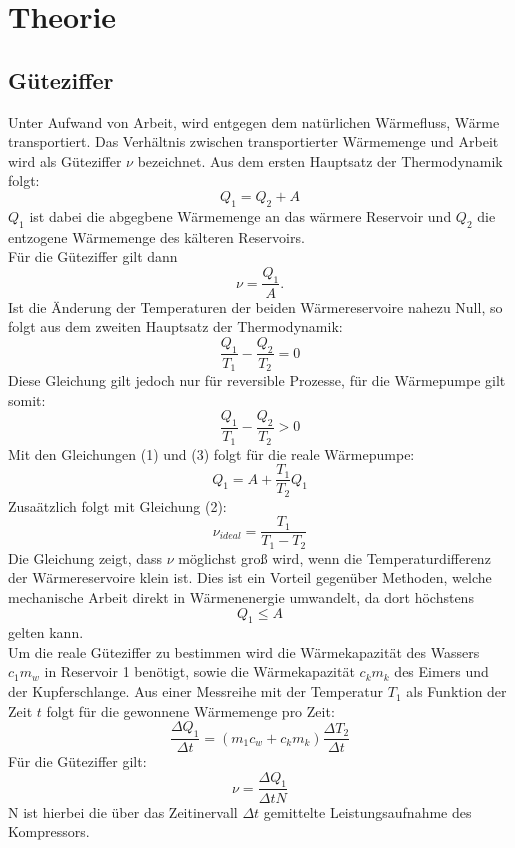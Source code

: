 \section{Theorie}
\subsection{Güteziffer}
Unter Aufwand von Arbeit, wird entgegen dem natürlichen Wärmefluss, Wärme transportiert.
Das Verhältnis zwischen transportierter Wärmemenge und Arbeit wird als Güteziffer $\nu$
bezeichnet. Aus dem ersten Hauptsatz der Thermodynamik folgt:
\begin{equation}
  Q_1 = Q_2 + A
\end{equation}
$Q_1$ ist dabei die abgegbene Wärmemenge an das wärmere Reservoir und $Q_2$ die
entzogene Wärmemenge des kälteren Reservoirs. \\
Für die Güteziffer gilt dann
\begin{equation}
  \nu = \frac{Q_1}{A} .
\end{equation}
Ist die Änderung der Temperaturen der beiden Wärmereservoire nahezu Null, so folgt
aus dem zweiten Hauptsatz der Thermodynamik:
\begin{equation}
  \frac{Q_1}{T_1} - \frac{Q_2}{T_2} = 0
\end{equation}
Diese Gleichung gilt jedoch nur für reversible Prozesse, für die Wärmepumpe gilt somit:
\begin{equation}
  \frac{Q_1}{T_1} - \frac{Q_2}{T_2} > 0
\end{equation}
Mit den Gleichungen (1) und (3) folgt für die reale Wärmepumpe:
\begin{equation}
  Q_1 = A + \frac{T_1}{T_2}Q_1
\end{equation}
Zusaätzlich folgt mit Gleichung (2):
\begin{equation}
  \nu_{ideal} = \frac{T_1}{T_1 - T_2}
\end{equation}
Die Gleichung zeigt, dass $\nu$ möglichst groß wird, wenn die Temperaturdifferenz
der Wärmereservoire klein ist. Dies ist ein Vorteil gegenüber Methoden, welche
mechanische Arbeit direkt in Wärmenenergie umwandelt, da dort höchstens
\begin{equation}
  Q_1 \leq A
\end{equation}
gelten kann. \\
Um die reale Güteziffer zu bestimmen wird die Wärmekapazität des Wassers $c_1m_w$ in Reservoir 1 benötigt,
sowie die Wärmekapazität $c_km_k$ des Eimers und der Kupferschlange. Aus einer Messreihe mit der Temperatur
$T_1$ als Funktion der Zeit $t$ folgt für die gewonnene Wärmemenge pro Zeit:
\begin{equation}
  \frac{\Delta Q_1}{\Delta t} = (m_1 c_w+ c_k m_k) \frac{\Delta T_2}{\Delta t}
\end{equation}
Für die Güteziffer gilt:
\begin{equation}
  \nu = \frac{\Delta Q_1}{\Delta t N}
\end{equation}
N ist hierbei die über das Zeitinervall $\Delta t$ gemittelte Leistungsaufnahme des Kompressors.
